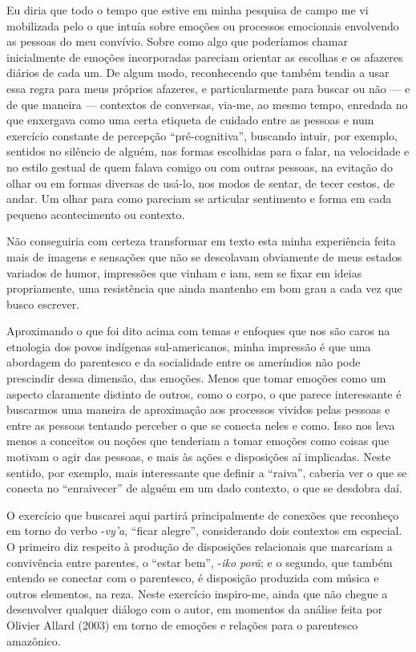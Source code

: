 Eu diria que todo o tempo que estive em minha pesquisa de campo me vi
mobilizada pelo o que intuía sobre emoções ou processos emocionais
envolvendo as pessoas do meu convívio. Sobre como algo que poderíamos
chamar inicialmente de emoções incorporadas pareciam orientar as
escolhas e os afazeres diários de cada um. De algum modo, reconhecendo
que também tendia a usar essa regra para meus próprios afazeres, e
particularmente para buscar ou não --- e de que maneira --- contextos de
conversas, via-me, ao mesmo tempo, enredada no que enxergava como uma
certa etiqueta de cuidado entre as pessoas e num exercício constante de
percepção ``pré-cognitiva'', buscando intuir, por exemplo, sentidos no
silêncio de alguém, nas formas escolhidas para o falar, na velocidade e
no estilo gestual de quem falava comigo ou com outras pessoas, na
evitação do olhar ou em formas diversas de usá-lo, nos modos de sentar,
de tecer cestos, de andar. Um olhar para como pareciam se articular
sentimento e forma em cada pequeno acontecimento ou contexto.

Não conseguiria com certeza transformar em texto esta minha experiência
feita mais de imagens e sensações que não se descolavam obviamente de
meus estados variados de humor, impressões que vinham e iam, sem se
fixar em ideias propriamente, uma resistência que ainda mantenho em bom
grau a cada vez que busco escrever.

Aproximando o que foi dito acima com temas e enfoques que nos são caros
na etnologia dos povos indígenas sul-americanos, minha impressão é que
uma abordagem do parentesco e da socialidade entre os ameríndios não
pode prescindir dessa dimensão, das emoções. Menos que tomar emoções
como um aspecto claramente distinto de outros, como o corpo, o que
parece interessante é buscarmos uma maneira de aproximação aos
processos vividos pelas pessoas e entre as pessoas tentando perceber o
que se conecta neles e como. Isso nos leva menos a conceitos ou noções
que tenderiam a tomar emoções como coisas que motivam o agir das
pessoas, e mais às ações e disposições aí implicadas. Neste sentido,
por exemplo, mais interessante que definir a ``raiva'', caberia ver o que
se conecta no ``enraivecer'' de alguém em um dado contexto, o que se
desdobra daí.

O exercício que buscarei aqui partirá principalmente de conexões que
reconheço em torno do verbo -\emph{vy’a}, ``ficar alegre'', considerando dois
contextos em especial. O primeiro diz respeito à produção de
disposições relacionais que marcariam a convivência entre parentes, o
``estar bem'', -\emph{iko porã}; e o segundo, que também entendo se conectar com
o parentesco, é disposição produzida com música e outros elementos, na
reza. Neste exercício inspiro-me, ainda que não chegue a desenvolver
qualquer diálogo com o autor, em momentos da análise feita por Olivier
Allard (2003) em torno de emoções e relações para o parentesco
amazônico.

